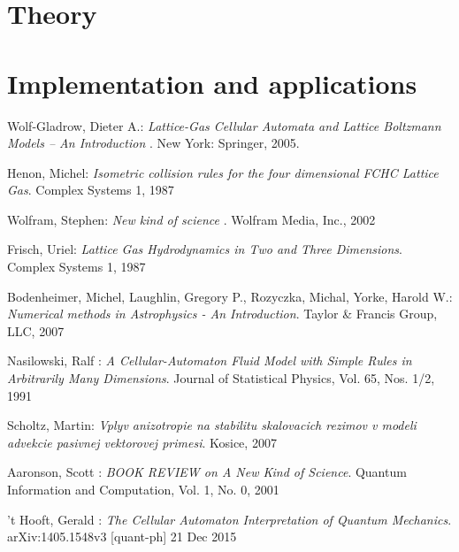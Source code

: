 \documentclass[12pt,a4paper,fleqn]{report}
\begin{document}



\tableofcontents


\part{Theory}








%

\part{Implementation and applications}

%






%

%

%
% 


\begin{thebibliography}{99}
 
   {\sc Wolf-Gladrow,} Dieter A.:
   \emph{ Lattice-Gas Cellular Automata and Lattice Boltzmann Models -- An Introduction }.
   New York: Springer, 2005.

   {\sc Henon,} Michel:
   \emph{ Isometric collision rules for the four dimensional FCHC Lattice Gas}.
   Complex Systems 1, 1987

   {\sc Wolfram,} Stephen:
   \emph{ New kind of science }.
   Wolfram Media, Inc., 2002

   {\sc Frisch,} Uriel:
   \emph{ Lattice Gas Hydrodynamics in Two and Three Dimensions}.
   Complex Systems 1, 1987

   {\sc Bodenheimer,} Michel, {\sc Laughlin,} Gregory P., {\sc Rozyczka,} Michal, {\sc Yorke,} Harold W.:
   \emph{ Numerical methods in Astrophysics - An Introduction}.
   Taylor \& Francis Group, LLC, 2007


   {\sc Nasilowski,} Ralf :
   \emph{ A Cellular-Automaton Fluid Model with Simple Rules in Arbitrarily Many Dimensions}.
   Journal of Statistical Physics, Vol. 65, Nos. 1/2, 1991

   {\sc Scholtz,} Martin:
   \emph{ Vplyv anizotropie na stabilitu skalovacich
rezimov v modeli advekcie pasivnej
vektorovej primesi}.
   Kosice, 2007
   

   {\sc Aaronson,} Scott :
   \emph{ BOOK REVIEW on A New Kind of Science}.
	Quantum Information and Computation, Vol. 1, No. 0, 2001


   {\sc 't Hooft,} Gerald :
   \emph{ The Cellular Automaton Interpretation of Quantum Mechanics}.
	arXiv:1405.1548v3 [quant-ph] 21 Dec 2015




\end{thebibliography}
\end{document}
